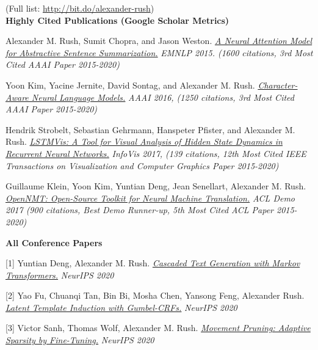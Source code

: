 \documentclass[10pt]{article}
\begin{document}

\noindent (Full list: \url{http://bit.do/alexander-rush}) \\

\medskip
\noindent
\textbf{Highly Cited Publications (Google Scholar Metrics)}

\ind Alexander M. Rush, Sumit Chopra, and Jason Weston. \emph{\href{ http://arxiv.org/pdf/1509.00685.pdf }{ A Neural Attention Model for Abstractive Sentence Summarization.} }\emph{ EMNLP 2015. (1600 citations, 3rd Most Cited AAAI Paper 2015-2020) }

\medskip


\ind Yoon Kim, Yacine Jernite, David Sontag, and Alexander M. Rush. \emph{\href{ https://arxiv.org/pdf/1508.06615v4 }{ Character-Aware Neural Language Models.} }\emph{ AAAI 2016, (1250 citations, 3rd Most Cited AAAI Paper 2015-2020) }

\medskip

\ind Hendrik Strobelt, Sebastian Gehrmann, Hanspeter Pfister, and Alexander M. Rush. \emph{\href{ http://lstm.seas.harvard.edu/ }{ LSTMVis: A Tool for Visual Analysis of Hidden State Dynamics in Recurrent Neural Networks.} }\emph{ InfoVis 2017, (139 citations, 12th Most Cited IEEE Transactions on Visualization and Computer Graphics Paper 2015-2020) }



\medskip
\ind Guillaume Klein, Yoon Kim, Yuntian Deng, Jean Senellart, Alexander M. Rush. \emph{\href{ https://arxiv.org/abs/1701.02810 }{ OpenNMT: Open-Source Toolkit for Neural Machine Translation.} }\emph{ ACL Demo 2017 (900 citations, Best Demo Runner-up, 5th Most Cited ACL Paper 2015-2020) }

\medskip

\noindent\textbf{All Conference Papers \vspace{0.01in}}


[1] \ind Yuntian Deng, Alexander M. Rush. \emph{\href{ https://arxiv.org/pdf/2006.01112 }{ Cascaded Text Generation with Markov Transformers.} }\emph{ NeurIPS 2020 }

\medskip


[2] \ind Yao Fu, Chuanqi Tan, Bin Bi, Mosha Chen, Yansong Feng, Alexander Rush. \emph{\href{ https://github.com/FranxYao/Gumbel-CRF }{ Latent Template Induction with Gumbel-CRFs.} }\emph{ NeurIPS 2020 }

\medskip


[3] \ind Victor Sanh, Thomas Wolf, Alexander M. Rush. \emph{\href{ https://arxiv.org/pdf/2005.07683 }{ Movement Pruning: Adaptive Sparsity by Fine-Tuning.} }\emph{ NeurIPS 2020 }
\end{document}
